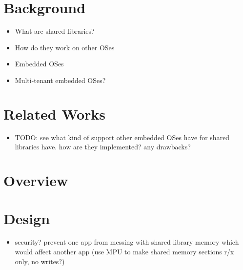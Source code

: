 \documentclass{article}
\begin{document}
\section*{Background}

\begin{itemize}
    \item What are shared libraries?
    \item How do they work on other OSes
    \item Embedded OSes
    \item Multi-tenant embedded OSes?
\end{itemize}

\section*{Related Works}

\begin{itemize}
    \item TODO: see what kind of support other embedded OSes have for shared libraries have. how are they implemented? any drawbacks?
\end{itemize}

\section*{Overview}

\section*{Design}

\begin{itemize}
    \item security? prevent one app from messing with shared library memory which would affect another app (use MPU to make shared memory sections r/x only, no writes?)
\end{itemize}
\end{document}
